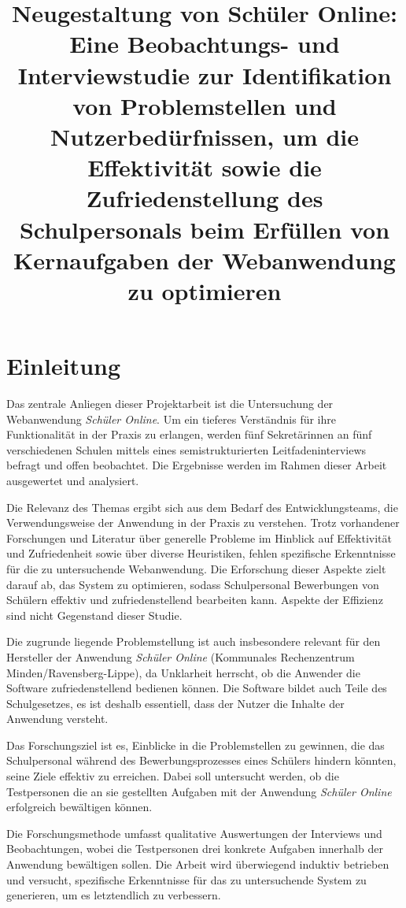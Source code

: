 \title{Neugestaltung von Schüler Online: Eine Beobachtungs- und Interviewstudie zur Identifikation von Problemstellen und Nutzerbedürfnissen, um die Effektivität sowie die Zufriedenstellung des Schulpersonals beim Erfüllen von Kernaufgaben der Webanwendung zu optimieren}

\section{Einleitung}

Das zentrale Anliegen dieser Projektarbeit ist die Untersuchung der Webanwendung \textit{Schüler Online}. Um ein tieferes Verständnis für ihre Funktionalität in der Praxis zu erlangen, werden fünf Sekretärinnen an fünf verschiedenen Schulen mittels eines semistrukturierten Leitfadeninterviews befragt und offen beobachtet. Die Ergebnisse werden im Rahmen dieser Arbeit ausgewertet und analysiert.

Die Relevanz des Themas ergibt sich aus dem Bedarf des Entwicklungsteams, die Verwendungsweise der Anwendung in der Praxis zu verstehen. Trotz vorhandener Forschungen und Literatur über generelle Probleme im Hinblick auf Effektivität und Zufriedenheit sowie über diverse Heuristiken, fehlen spezifische Erkenntnisse für die zu untersuchende Webanwendung. Die Erforschung dieser Aspekte zielt darauf ab, das System zu optimieren, sodass Schulpersonal Bewerbungen von Schülern effektiv und zufriedenstellend bearbeiten kann. Aspekte der Effizienz sind nicht Gegenstand dieser Studie.

Die zugrunde liegende Problemstellung ist auch insbesondere relevant für den Hersteller der Anwendung \textit{Schüler Online} (\glqq Kommunales Rechenzentrum Minden/Ravensberg-Lippe\grqq{}), da Unklarheit herrscht, ob die Anwender die Software zufriedenstellend bedienen können. Die Software bildet auch Teile des Schulgesetzes, es ist deshalb essentiell, dass der Nutzer die Inhalte der Anwendung versteht. 

Das Forschungsziel ist es, Einblicke in die Problemstellen zu gewinnen, die das Schulpersonal während des Bewerbungsprozesses eines Schülers hindern könnten, seine Ziele effektiv zu erreichen. Dabei soll untersucht werden, ob die Testpersonen die an sie gestellten Aufgaben mit der Anwendung \textit{Schüler Online}  erfolgreich bewältigen können. 

Die Forschungsmethode umfasst qualitative Auswertungen der Interviews und Beobachtungen, wobei die Testpersonen drei konkrete Aufgaben innerhalb der Anwendung bewältigen sollen. Die Arbeit wird überwiegend induktiv betrieben und versucht, spezifische Erkenntnisse für das zu untersuchende System zu generieren, um es letztendlich zu verbessern.

